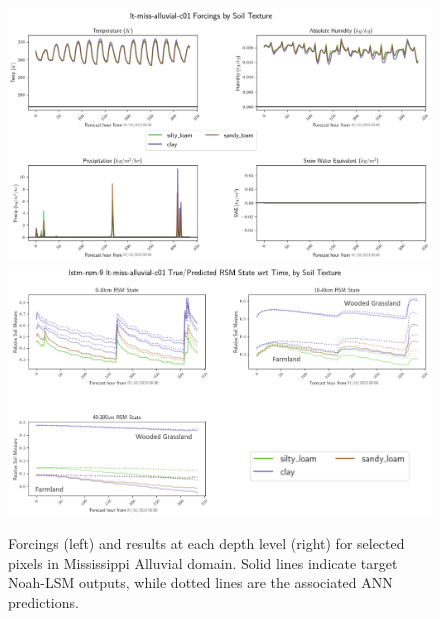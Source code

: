 \begin{figure}[H]
    \centering

    \includegraphics[width=.98\linewidth,draft=false]{figures/lt-miss-alluvial/eval-grid_lt-miss-alluvial-c01_lstm-rsm-9_rsm_keep-all_bias_forcings.png}
    \includegraphics[width=.98\linewidth,draft=false]{figures/lt-miss-alluvial/eval-grid_lt-miss-alluvial-c01_lstm-rsm-9_rsm_keep-all_bias_state-seq-textures-all_labeled.png}

    \caption{Forcings (left) and results at each depth level (right) for selected pixels in Mississippi Alluvial domain. Solid lines indicate target Noah-LSM outputs, while dotted lines are the associated ANN predictions.}
    \label{lt_sequence-c01_miss-alluvial}
\end{figure}

